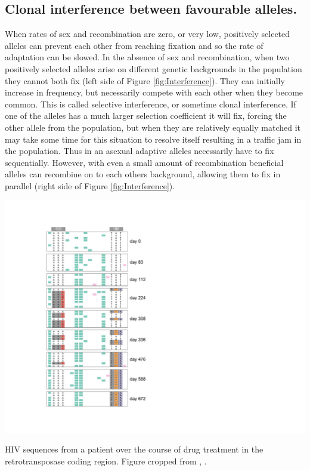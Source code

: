 \subsection{Clonal interference between favourable alleles.}
When rates of sex and recombination are zero, or very low, positively selected alleles can prevent each other from reaching fixation and so the rate of adaptation can be slowed.
In the absence of sex and recombination, when two positively selected alleles arise on different genetic backgrounds in the population they cannot both fix (left side of Figure \ref{fig:Interference}). They can initially increase in frequency, but necessarily compete with each other when they become common. This is called selective interference, or sometime clonal interference. If one of the alleles has a much larger selection coefficient it will fix, forcing the other allele from the population, but when they are relatively equally matched it may take some time for this situation to resolve itself resulting in a traffic jam in the population. Thus in an asexual adaptive alleles necessarily have to fix sequentially. However, with even a small amount of recombination beneficial alleles can recombine on to each others background, allowing them to fix in parallel (right side of  Figure \ref{fig:Interference}).   

\begin{marginfigure}
\begin{center}
  \includegraphics[width =  \textwidth]{Journal_figs/recom_selection/Pleuni_HIV_interference/Trimmed_HIV_interference}  %
\end{center}
\caption{HIV sequences from a patient over the course of drug treatment in the retrotransposase coding region. Figure cropped from \citet{Williams548198}, \PLOSccBY.} \label{fig:HIV_interference}  %
\end{marginfigure}

